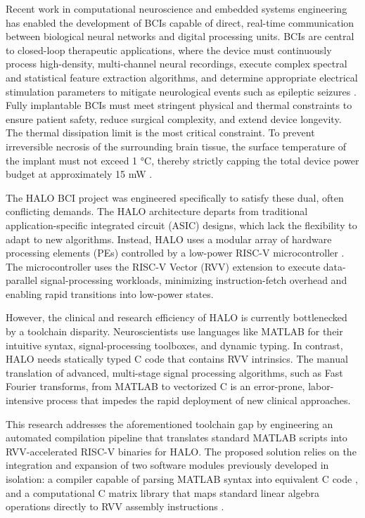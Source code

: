 Recent work in computational neuroscience and embedded systems engineering has enabled the development of BCIs capable of direct, real-time communication between biological neural networks and digital processing units. BCIs are central to closed-loop therapeutic applications, where the device must continuously process high-density, multi-channel neural recordings, execute complex spectral and statistical feature extraction algorithms, and determine appropriate electrical stimulation parameters to mitigate neurological events such as epileptic seizures \cite{9138938}. Fully implantable BCIs must meet stringent physical and thermal constraints to ensure patient safety, reduce surgical complexity, and extend device longevity. The thermal dissipation limit is the most critical constraint. To prevent irreversible necrosis of the surrounding brain tissue, the surface temperature of the implant must not exceed 1 °C, thereby strictly capping the total device power budget at approximately 15 mW \cite{10120914}.

The HALO BCI project was engineered specifically to satisfy these dual, often conflicting demands. The HALO architecture departs from traditional application-specific integrated circuit (ASIC) designs, which lack the flexibility to adapt to new algorithms. Instead, HALO uses a modular array of hardware processing elements (PEs) controlled by a low-power RISC-V microcontroller \cite{9138938}. The microcontroller uses the RISC-V Vector (RVV) extension to execute data-parallel signal-processing workloads, minimizing instruction-fetch overhead and enabling rapid transitions into low-power states. 

However, the clinical and research efficiency of HALO is currently bottlenecked by a toolchain disparity. Neuroscientists use languages like MATLAB for their intuitive syntax, signal-processing toolboxes, and dynamic typing. In contrast, HALO needs statically typed C code that contains RVV intrinsics. The manual translation of advanced, multi-stage signal processing algorithms, such as Fast Fourier transforms, from MATLAB to vectorized C is an error-prone, labor-intensive process that impedes the rapid deployment of new clinical approaches. 

This research addresses the aforementioned toolchain gap by engineering an automated compilation pipeline that translates standard MATLAB scripts into RVV-accelerated RISC-V binaries for HALO. The proposed solution relies on the integration and expansion of two software modules previously developed in isolation: a compiler capable of parsing MATLAB syntax into equivalent C code \cite{ts}, and a computational C matrix library that maps standard linear algebra operations directly to RVV assembly instructions \cite{riscvmatrix}.


